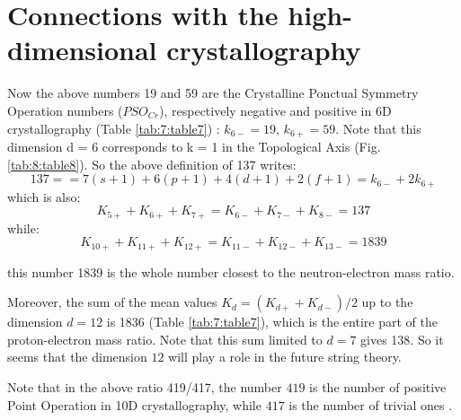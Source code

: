 \documentclass[a4paper,9pt]{article}
\begin{document}
 
 
 
 
 
 
 
 
 \section{Connections with the high-dimensional crystallography}
 
 Now the above numbers 19 and 59 are the Crystalline Ponctual Symmetry Operation numbers ($PSO_{Cr}$), respectively negative and positive in 6D crystallography \cite{Weigel} (Table \ref{tab:7:table7}) : $k_{6-} = 19$, $k_{6+} = 59$. Note that this dimension d = 6 corresponds to k = 1 in the Topological Axis (Fig. \ref{tab:8:table8}). So the above definition of 137 writes:
  \begin{equation}
   137 =   = 7(s +1) + 6(p +1) + 4(d +1) + 2(f +1) = k_{6-} + 2k_{6+}   
    \end{equation}
    which is also:
    \begin{equation}
    K_{5+}+K_{6+}+K_{7+} = K_{6-} + K_{7-} +K_{8-} = 137   
    \end{equation}
    while:
    \begin{equation}
    K_{10+} +K_{11+}+K_{12+} = K_{11-} +K_{12-}+K_{13-} = 1839   
    \end{equation}
    
    this number 1839 is the whole number closest to the neutron-electron mass ratio.


    
    Moreover, the sum of the mean values $K_{d} = (K_{d+} + K_{d-})/2$ up to the dimension $d = 12$ is 1836 (Table \ref{tab:7:table7}), which is the entire part of the proton-electron mass ratio. Note that this sum limited to $d = 7$ gives 138. So it seems that the dimension $12$ will play a role in the future string theory.
    
    
    Note that in the  above ratio 419/417, the number $419$ is the number of positive Point Operation in 10D crystallography, while $417$ is the number of trivial ones .
\end{document}
